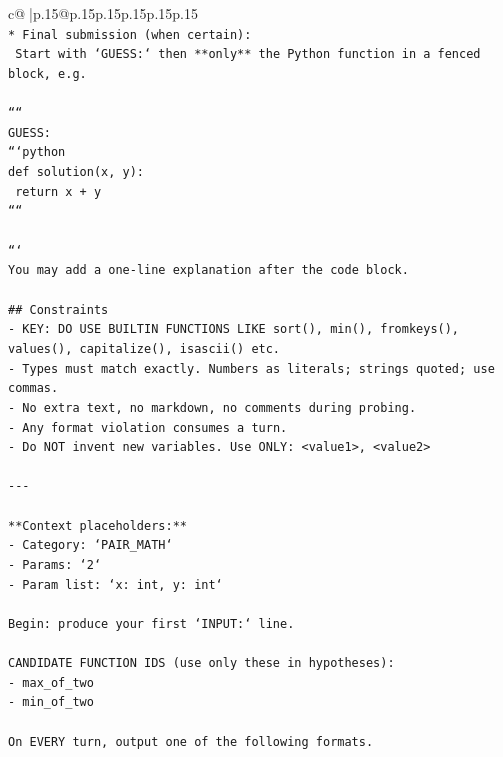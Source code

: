 \documentclass{article}
\begin{document}
{\begin{supertabular}{c@{$\;$}|p{.15\linewidth}@{}p{.15\linewidth}p{.15\linewidth}p{.15\linewidth}p{.15\linewidth}p{.15\linewidth}}
{{{\\ 
\texttt{* Final submission (when certain):} \\
\texttt{  Start with `GUESS:` then **only** the Python function in a fenced block, e.g.} \\
\\ 
\texttt{````} \\
\texttt{GUESS:} \\
\texttt{```python} \\
\texttt{def solution(x, y):} \\
\texttt{    return x + y} \\
\texttt{````} \\
\\ 
\texttt{```} \\
\texttt{You may add a one{-}line explanation after the code block.} \\
\\ 
\texttt{\#\# Constraints} \\
\texttt{{-} KEY: DO USE BUILTIN FUNCTIONS LIKE sort(), min(), fromkeys(), values(), capitalize(), isascii() etc.} \\
\texttt{{-} Types must match exactly. Numbers as literals; strings quoted; use commas.} \\
\texttt{{-} No extra text, no markdown, no comments during probing.} \\
\texttt{{-} Any format violation consumes a turn.} \\
\texttt{{-} Do NOT invent new variables. Use ONLY: <value1>, <value2>} \\
\\ 
\texttt{{-}{-}{-}} \\
\\ 
\texttt{**Context placeholders:**} \\
\texttt{{-} Category: `PAIR\_MATH`} \\
\texttt{{-} Params: `2`} \\
\texttt{{-} Param list: `x: int, y: int`} \\
\\ 
\texttt{Begin: produce your first `INPUT:` line.} \\
\\ 
\texttt{CANDIDATE FUNCTION IDS (use only these in hypotheses):} \\
\texttt{{-} max\_of\_two} \\
\texttt{{-} min\_of\_two} \\
\\ 
\texttt{On EVERY turn, output one of the following formats.} \\
}}}
\end{supertabular}}
\end{document}
